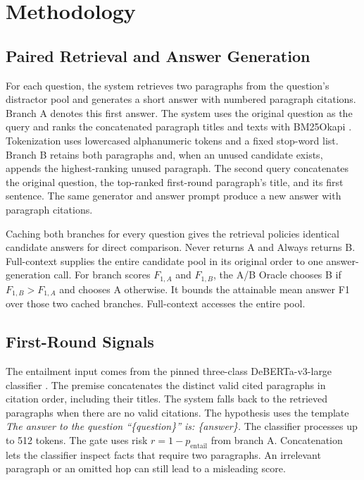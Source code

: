 \section{Methodology}
\label{sec:methodology}

\subsection{Paired Retrieval and Answer Generation}
For each question, the system retrieves two paragraphs from the question's distractor pool and generates a short answer with numbered paragraph citations. Branch A denotes this first answer. The system uses the original question as the query and ranks the concatenated paragraph titles and texts with BM25Okapi \cite{bm25}. Tokenization uses lowercased alphanumeric tokens and a fixed stop-word list. Branch B retains both paragraphs and, when an unused candidate exists, appends the highest-ranking unused paragraph. The second query concatenates the original question, the top-ranked first-round paragraph's title, and its first sentence. The same generator and answer prompt produce a new answer with paragraph citations.

Caching both branches for every question gives the retrieval policies identical candidate answers for direct comparison. Never returns A and Always returns B. Full-context supplies the entire candidate pool in its original order to one answer-generation call. For branch scores $F_{1,A}$ and $F_{1,B}$, the A/B Oracle chooses B if $F_{1,B}>F_{1,A}$ and chooses A otherwise. It bounds the attainable mean answer F1 over those two cached branches. Full-context accesses the entire pool.

\subsection{First-Round Signals}
The entailment input comes from the pinned three-class DeBERTa-v3-large classifier \cite{nlicheckpoint}. The premise concatenates the distinct valid cited paragraphs in citation order, including their titles. The system falls back to the retrieved paragraphs when there are no valid citations. The hypothesis uses the template \textit{The answer to the question \textquotedblleft\{question\}\textquotedblright{} is: \{answer\}.} The classifier processes up to 512 tokens. The gate uses risk $r=1-p_\mathrm{entail}$ from branch A. Concatenation lets the classifier inspect facts that require two paragraphs. An irrelevant paragraph or an omitted hop can still lead to a misleading score.

